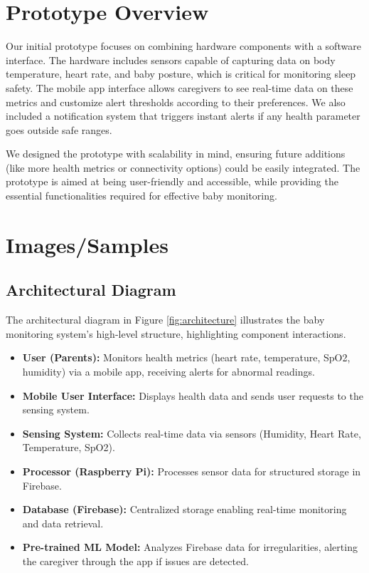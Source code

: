\documentclass[12pt,a4paper]{report}
\begin{document}
\section{Prototype Overview}
Our initial prototype focuses on combining hardware components with a software interface. The hardware includes sensors capable of capturing data on body temperature, heart rate, and baby posture, which is critical for monitoring sleep safety. The mobile app interface allows caregivers to see real-time data on these metrics and customize alert thresholds according to their preferences. We also included a notification system that triggers instant alerts if any health parameter goes outside safe ranges.

We designed the prototype with scalability in mind, ensuring future additions (like more health metrics or connectivity options) could be easily integrated. The prototype is aimed at being user-friendly and accessible, while providing the essential functionalities required for effective baby monitoring.

\section{Images/Samples}
\subsection{Architectural Diagram}
The architectural diagram in Figure \ref{fig:architecture} illustrates the baby monitoring system's high-level structure, highlighting component interactions.

\begin{itemize}
  \item \textbf{User (Parents):} Monitors health metrics (heart rate, temperature, SpO2, humidity) via a mobile app, receiving alerts for abnormal readings.
  \item \textbf{Mobile User Interface:} Displays health data and sends user requests to the sensing system.
  \item \textbf{Sensing System:} Collects real-time data via sensors (Humidity, Heart Rate, Temperature, SpO2).
  \item \textbf{Processor (Raspberry Pi):} Processes sensor data for structured storage in Firebase.
  \item \textbf{Database (Firebase):} Centralized storage enabling real-time monitoring and data retrieval.
  \item \textbf{Pre-trained ML Model:} Analyzes Firebase data for irregularities, alerting the caregiver through the app if issues are detected.
\end{itemize}
\end{document}
